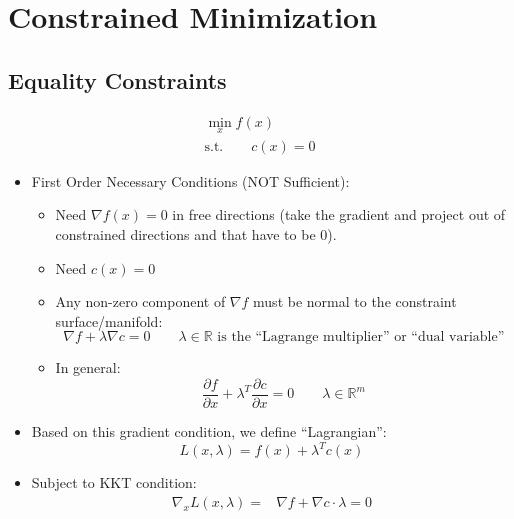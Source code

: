 \section{Constrained Minimization}

\subsection{Equality Constraints}

\begin{equation}
    \begin{aligned}
        \min_x f(x) \\
        \text{s.t.} \qquad c(x) = 0
    \end{aligned}
\end{equation}

\begin{itemize}
    \item First Order Necessary Conditions (NOT Sufficient):
    \begin{itemize}
        \item Need $\nabla f(x) = 0$ in free directions (take the gradient and project out of constrained directions and that have to be 0).
        \item Need $c(x)=0$
        \item[*] Any non-zero component of $\nabla f$ must be normal to the constraint surface/manifold:
        \begin{equation}
            \nabla f+\lambda\nabla c=0\qquad\lambda \in \mathbb{R}\text{ is the ``Lagrange multiplier'' or ``dual variable''}
        \end{equation}
        \item[*] In general:
        \begin{equation}
            \frac{\partial f}{\partial x} + \lambda^T \frac{\partial c}{\partial x} = 0\qquad\lambda \in \mathbb{R}^m
        \end{equation}
    \end{itemize}
    \item Based on this gradient condition, we define ``Lagrangian'':
    \begin{equation}
        L(x,\lambda)=f(x)+\lambda^T c(x)
    \end{equation}
    \item Subject to KKT condition:
    \begin{equation}
        \begin{aligned}
            \nabla_x L(x,\lambda)=&\nabla f+\nabla c \cdot \lambda=0\\

\end{aligned}
\end{equation}
\end{itemize}

